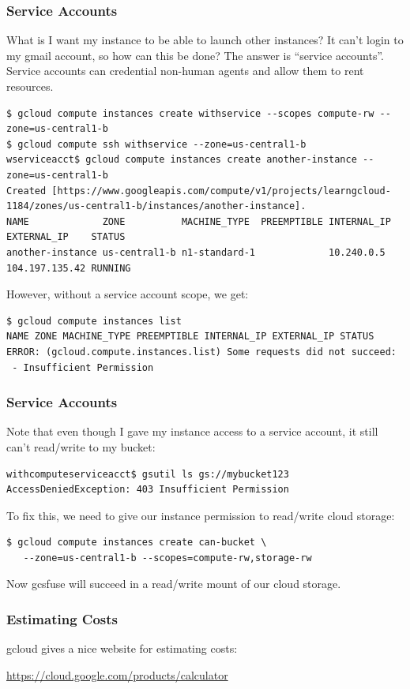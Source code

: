 \documentclass[9pt]{beamer}
\begin{document}
\begin{frame}[fragile]
\frametitle{Service Accounts}
What is I want my instance to be able to launch other instances? It can't login to my gmail account, so how can this be done? The answer is ``service accounts''. Service accounts can credential non-human agents and allow them to rent resources.
\begin{verbatim}
$ gcloud compute instances create withservice --scopes compute-rw --zone=us-central1-b
$ gcloud compute ssh withservice --zone=us-central1-b
wserviceacct$ gcloud compute instances create another-instance --zone=us-central1-b
Created [https://www.googleapis.com/compute/v1/projects/learngcloud-1184/zones/us-central1-b/instances/another-instance].
NAME             ZONE          MACHINE_TYPE  PREEMPTIBLE INTERNAL_IP EXTERNAL_IP    STATUS
another-instance us-central1-b n1-standard-1             10.240.0.5  104.197.135.42 RUNNING
\end{verbatim}
However, without a service account scope, we get:
\begin{verbatim}
$ gcloud compute instances list
NAME ZONE MACHINE_TYPE PREEMPTIBLE INTERNAL_IP EXTERNAL_IP STATUS
ERROR: (gcloud.compute.instances.list) Some requests did not succeed:
 - Insufficient Permission
\end{verbatim}
\end{frame}

\begin{frame}[fragile]
\frametitle{Service Accounts}
Note that even though I gave my instance access to a service account, it still can't read/write to my bucket:
\begin{verbatim}
withcomputeserviceacct$ gsutil ls gs://mybucket123
AccessDeniedException: 403 Insufficient Permission
\end{verbatim}
To fix this, we need to give our instance permission to read/write cloud storage:
\begin{verbatim}
$ gcloud compute instances create can-bucket \
   --zone=us-central1-b --scopes=compute-rw,storage-rw
\end{verbatim}
Now gcsfuse will succeed in a read/write mount of our cloud storage.
\end{frame}



\begin{frame}[fragile]
\frametitle{Estimating Costs}
gcloud gives a nice website for estimating costs: 

\href{https://cloud.google.com/products/calculator}{https://cloud.google.com/products/calculator}
\end{frame}
\end{document}
